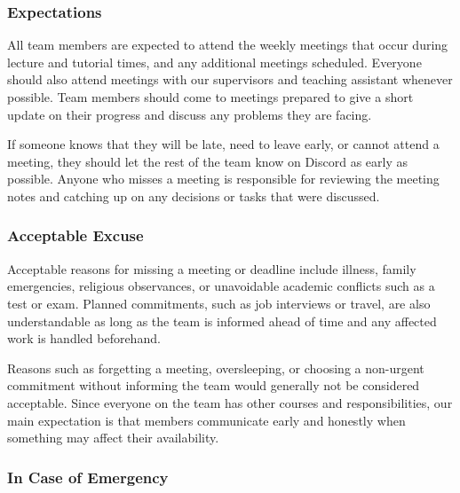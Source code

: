 \documentclass{article}
\begin{document}
\subsubsection*{Expectations}



All team members are expected to attend the weekly meetings that occur during
lecture and tutorial times, and any additional meetings scheduled. Everyone
should also attend meetings with our supervisors and teaching assistant whenever
possible. Team members should come to meetings prepared to give a short update
on their progress and discuss any problems they are facing.

\bigskip
If someone knows that they will be late, need to leave early, or cannot attend a
meeting, they should let the rest of the team know on Discord as early as
possible. Anyone who misses a meeting is responsible for reviewing the meeting
notes and catching up on any decisions or tasks that were discussed.

\subsubsection*{Acceptable Excuse}


Acceptable reasons for missing a meeting or deadline include illness, family
emergencies, religious observances, or unavoidable academic conflicts such as a
test or exam. Planned commitments, such as job interviews or travel, are also
understandable as long as the team is informed ahead of time and any affected
work is handled beforehand.

\bigskip
Reasons such as forgetting a meeting, oversleeping, or choosing a non-urgent
commitment without informing the team would generally not be considered
acceptable. Since everyone on the team has other courses and responsibilities,
our main expectation is that members communicate early and honestly when
something may affect their availability.

\subsubsection*{In Case of Emergency}
\end{document}
